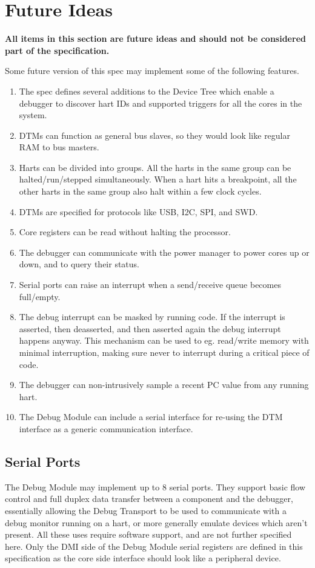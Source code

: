 \chapter{Future Ideas}
\label{sec:future}

\textbf{All items in this section are future ideas and should not be considered part of the specification.}

Some future version of this spec may implement some of the following features.

\begin{enumerate}
   \item The spec defines several additions to the Device Tree which enable a
      debugger to discover hart IDs and supported triggers for all the cores
      in the system.
   \item DTMs can function as general bus slaves, so they would look like
      regular RAM to bus masters.
   \item Harts can be divided into groups. All the harts in the same group can
      be halted/run/stepped simultaneously. When a hart hits a breakpoint, all
      the other harts in the same group also halt within a few clock cycles.
   \item DTMs are specified for protocols like USB, I2C, SPI, and SWD.
   \item Core registers can be read without halting the processor.
   \item The debugger can communicate with the power manager to power cores up
      or down, and to query their status.
   \item Serial ports can raise an interrupt when a send/receive queue becomes full/empty.
   \item The debug interrupt can be masked by running code. If the interrupt is
      asserted, then deasserted, and then asserted again the debug interrupt
      happens anyway. This mechanism can be used to eg. read/write memory with
      minimal interruption, making sure never to interrupt during a critical
      piece of code.
   \item The debugger can non-intrusively sample a recent PC value from any
      running hart.
   \item The Debug Module can include a serial interface for re-using
      the DTM interface as a generic communication interface.
\end{enumerate}

\section{Serial Ports}

The Debug Module may implement up to 8 serial ports. They support basic flow
control and full duplex data transfer between a component and the debugger,
essentially allowing the Debug Transport to be used to communicate
with a debug monitor running on a hart, or more generally emulate devices which
aren't present. All these uses require software support, and are not further specified here.
Only the DMI side of the Debug Module serial registers are defined in this
specification as the core side interface should look like a peripheral device.


